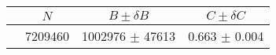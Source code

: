 \begin{tabular}{lccc}
\hline
    &   $N$   & $B \pm \delta B$  &  $C \pm \delta C$ \\
\hline
                               & 7209460    & 1002976    $\pm$ 47613 & 0.663      $\pm$ 0.004 \\
\hline
\end{tabular}
